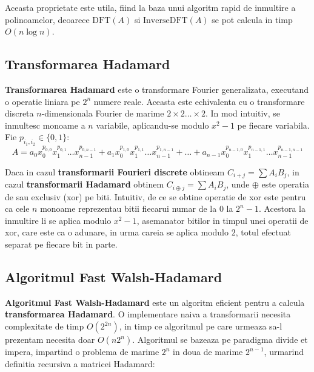 Aceasta proprietate este utila, fiind la baza unui algoritm rapid de inmultire a
polinoamelor, deoarece $\text{DFT}(A)$ si $\text{InverseDFT}(A)$ se pot calcula
in timp $O(n \log n)$.

\subsection{Transformarea Hadamard}

\textbf{Transformarea Hadamard} este o transformare Fourier generalizata,
executand o operatie liniara pe $2^{n}$ numere reale. Aceasta este echivalenta
cu o transformare discreta $n$-dimensionala Fourier de marime
$2 \times 2 \ldots \times 2$. In mod intuitiv, se inmultesc monoame a $n$
variabile, aplicandu-se modulo $x^{2}-1$ pe fiecare variabila. Fie $p_{i_{1}, i_{2}} \in \{0, 1\}$:
\begin{equation}
  A = a_{0} x_{0}^{p_{0, 0}} x_{1}^{p_{0, 1}} \ldots x_{n-1}^{p_{0, n-1}}
  + a_{1} x_{0}^{p_{1, 0}} x_{1}^{p_{1, 1}} \ldots x_{n-1}^{p_{1, n-1}}
  + \ldots
  + a_{n-1} x_{0}^{p_{n-1, 0}} x_{1}^{p_{n-1, 1}} \ldots x_{n-1}^{p_{n-1, n-1}}
\end{equation}

Daca in cazul \textbf{transformarii Fourieri discrete} obtineam
$C_{i+j} = \displaystyle\sum\limits A_{i} B_{j}$, in cazul \textbf{transformarii Hadamard} obtinem
$C_{i \oplus j} = \displaystyle\sum\limits A_{i} B_{j}$, unde $\oplus$ este operatia de sau exclusiv
(xor) pe biti. Intuitiv, de ce se obtine operatie de xor este pentru ca
cele $n$ monoame reprezentau bitii fiecarui numar de la $0$ la $2^{n} - 1$.
Acestora la inmultire li se aplica modulo $x^{2} - 1$, asemanator bitilor in
timpul unei operatii de xor, care este ca o adunare, in urma careia se aplica
modulo $2$, totul efectuat separat pe fiecare bit in parte.

\subsection{Algoritmul Fast Walsh-Hadamard}

\textbf{Algoritmul Fast Walsh-Hadamard} este un algoritm eficient pentru a
calcula \textbf{transformarea Hadamard}. O implementare naiva a transformarii
necesita complexitate de timp $O(2^{2n})$, in timp ce algoritmul pe care urmeaza
sa-l prezentam necesita doar $O(n2^{n})$. Algoritmul se bazeaza pe paradigma
divide et impera, impartind o problema de marime $2^{n}$ in doua de marime
$2^{n-1}$, urmarind definitia recursiva a matricei Hadamard:

